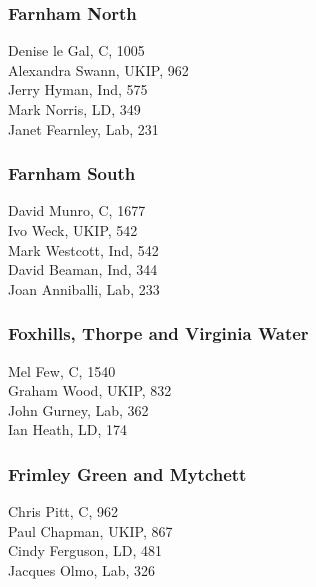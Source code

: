 \documentclass[a4paper,openany,10pt]{book}
\begin{document}
\subsubsection*{Farnham North}



Denise le Gal, C, 1005\\
Alexandra Swann, UKIP, 962\\
Jerry Hyman, Ind, 575\\
Mark Norris, LD, 349\\
Janet Fearnley, Lab, 231\\


\subsubsection*{Farnham South}



David Munro, C, 1677\\
Ivo Weck, UKIP, 542\\
Mark Westcott, Ind, 542\\
David Beaman, Ind, 344\\
Joan Anniballi, Lab, 233\\


\subsubsection*{Foxhills, Thorpe and Virginia Water}



Mel Few, C, 1540\\
Graham Wood, UKIP, 832\\
John Gurney, Lab, 362\\
Ian Heath, LD, 174\\


\subsubsection*{Frimley Green and Mytchett}



Chris Pitt, C, 962\\
Paul Chapman, UKIP, 867\\
Cindy Ferguson, LD, 481\\
Jacques Olmo, Lab, 326\\
\end{document}
